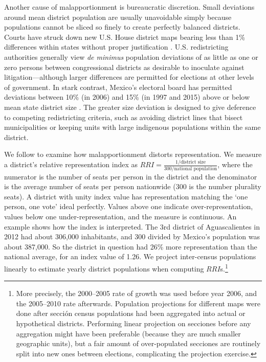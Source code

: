 \documentclass[letter,12pt]{article}
\begin{document}
{Another cause of malapportionment is bureaucratic discretion. Small deviations around mean district population are usually unavoidable simply because populations cannot be sliced so finely to create perfectly balanced districts. Courts have struck down new U.S. House district maps bearing less than 1\% differences within states without proper justification \citep{tuckerApportionment.1985}. U.S. redistricting authorities generally view \emph{de minimus} population deviations of as little as one or zero persons between congressional districts as desirable to inoculate against litigation---although larger differences are permitted for elections at other levels of government. In stark contrast, Mexico's electoral board has permitted deviations between 10\% (in 2006) and 15\% (in 1997 and 2015) above or below mean state district size \citep{lujambio.vives.2008,trelles.mtz.polygob2012}. The greater size deviation is designed to give deference to competing redistricting criteria, such as avoiding district lines that bisect municipalities or keeping units with large indigenous populations within the same district. 

We follow \citet{ansolabehere.gerber.snyderCourtRedis2002} to examine how malapportionment distorts representation. We measure a district's relative representation index as $RRI = \frac{1/\text{district size}}{300/\text{national population}}$, where the numerator is the number of seats per person in the district and the denominator is the average number of seats per person nationwide (300 is the number plurality seats). A district with unity index value has representation matching the `one person, one vote' ideal perfectly. Values above one indicate over-representation, values below one under-representation, and the measure is continuous. An example shows how the index is interpreted. The 3rd district of Aguascalientes in 2012 had about 306,000 inhabitants, and 300 divided by Mexico's population was about 387,000. So the district in question had 26\% more representation than the national average, for an index value of 1.26. We project inter-census populations linearly to estimate yearly district populations when computing $RRI$s.\footnote{More precisely, the 2000--2005 rate of growth was used before year 2006, and the 2005--2010 rate afterwards. Population projections for different maps were done after secci\'on census populations had been aggregated into actual or hypothetical districts. Performing linear projection on secciones before any aggregation might have been preferable (because they are much smaller geographic units), but a fair amount of over-populated secciones are routinely split into new ones between elections, complicating the projection exercise.} 

}
\end{document}
